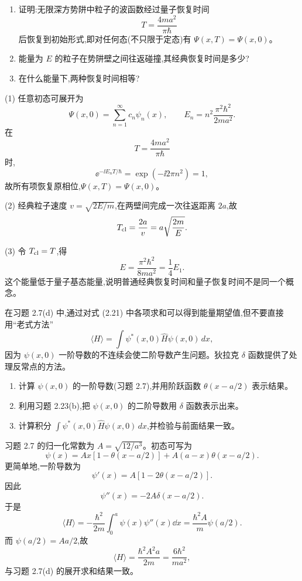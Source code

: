 \begin{question}
\begin{enumerate}
\item 证明:无限深方势阱中粒子的波函数经过量子恢复时间
\[
T=\frac{4ma^2}{\pi\hbar}
\]
后恢复到初始形式,即对任何态(不只限于定态)有 $\Psi(x,T)=\Psi(x,0)$。
\item 能量为 $E$ 的粒子在势阱壁之间往返碰撞,其经典恢复时间是多少?
\item 在什么能量下,两种恢复时间相等?
\end{enumerate}
\begin{solution}
(1) 任意初态可展开为
\[
\Psi(x,0)=\sum_{n=1}^{\infty}c_n\psi_n(x),
\qquad
E_n=n^2\frac{\pi^2\hbar^2}{2ma^2}.
\]
在
\[
T=\frac{4ma^2}{\pi\hbar}
\]
时,
\[
\ee^{-\ii E_nT/\hbar}=\exp(-\ii 2\pi n^2)=1,
\]
故所有项恢复原相位,$\Psi(x,T)=\Psi(x,0)$。

(2) 经典粒子速度 $v=\sqrt{2E/m}$,在两壁间完成一次往返距离 $2a$,故
\[
T_{\rm cl}=\frac{2a}{v}=a\sqrt{\frac{2m}{E}}.
\]

(3) 令 $T_{\rm cl}=T$,得
\[
E=\frac{\pi^2\hbar^2}{8ma^2}=\frac14E_1.
\]
这个能量低于量子基态能量,说明普通经典恢复时间和量子恢复时间不是同一个概念。
\end{solution}
\end{question}

\begin{question}
在习题 2.7(d) 中,通过对式 (2.21) 中各项求和可以得到能量期望值,但不要直接用“老式方法”
\[
\langle H\rangle=\int \psi^*(x,0)\hat H\psi(x,0)\,dx,
\]
因为 $\psi(x,0)$ 一阶导数的不连续会使二阶导数产生问题。狄拉克 $\delta$ 函数提供了处理反常点的方法。
\begin{enumerate}
\item 计算 $\psi(x,0)$ 的一阶导数(习题 2.7),并用阶跃函数 $\theta(x-a/2)$ 表示结果。
\item 利用习题 2.23(b),把 $\psi(x,0)$ 的二阶导数用 $\delta$ 函数表示出来。
\item 计算积分 $\int\psi^*(x,0)\hat H\psi(x,0)\,dx$,并检验与前面结果一致。
\end{enumerate}

\par\smallskip
{}

\begin{solution}
习题 2.7 的归一化常数为 $A=\sqrt{12/a^3}$。初态可写为
\[
\psi(x)=Ax[1-\theta(x-a/2)]+A(a-x)\theta(x-a/2).
\]
更简单地,一阶导数为
\[
\psi'(x)=A\left[1-2\theta(x-a/2)\right].
\]
因此
\[
\psi''(x)=-2A\delta(x-a/2).
\]
于是
\[
\langle H\rangle=-\frac{\hbar^2}{2m}\int_0^a\psi(x)\psi''(x)\dd x
=\frac{\hbar^2A}{m}\psi(a/2).
\]
而 $\psi(a/2)=Aa/2$,故
\[
\langle H\rangle=\frac{\hbar^2A^2a}{2m}
=\frac{6\hbar^2}{ma^2},
\]
与习题 2.7(d) 的展开求和结果一致。
\end{solution}
\end{question}

